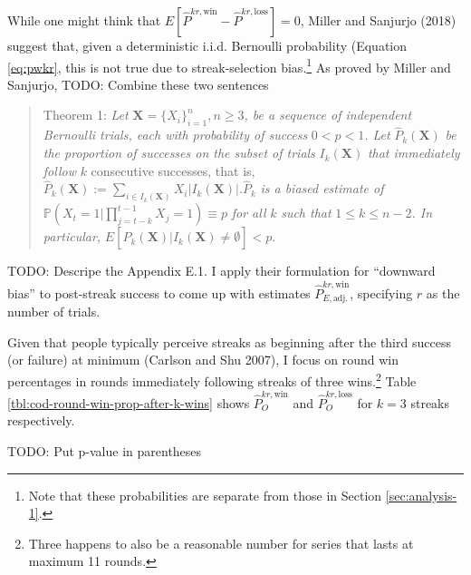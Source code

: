 \documentclass{article}
\begin{document}
While one might think that
\(E[\hat{P}^{kr,\text{win}} - \hat{P}^{kr,\text{loss}}] = 0\), Miller
and Sanjurjo (2018) suggest that, given a deterministic i.i.d. Bernoulli
probability (Equation \ref{eq:pwkr}, this is not true due to
streak-selection bias.\footnote{Note that these probabilities are
  separate from those in Section \ref{sec:analysis-1}.} As proved by
Miller and Sanjurjo, TODO: Combine these two sentences

\begin{quote}
Theorem 1: \emph{Let}
\(\mathbf{X} = \{X_i\}^{n}_{i=1}, n \geq 3\)\emph{, be a sequence of
independent Bernoulli trials, each with probability of success}
\(0 < p < 1\)\emph{. Let} \(\hat{P}_k(\mathbf{X})\) \emph{be the
proportion of successes on the subset of trials} \(I_k(\mathbf{X})\)
\emph{that immediately follow} \(k\) consecutive successes, that is,
\(\hat{P}_k(\mathbf{X}) := \sum_{i \in I_k(\mathbf{X})} X_i | I_k(\mathbf{X}) |. \hat{P}_k\)
\emph{is a biased estimate of}
\(\mathbb{P}(X_t = 1 | \prod_{j=t-k}^{t-1} X_j = 1) \equiv p\) \emph{for
all} \(k\) \emph{such that} \(1 \leq k \leq n - 2\)\emph{. In
particular,}
\(E[\hat{P}_k(\mathbf{X}) | I_k(\mathbf{X}) \neq \emptyset] < p.\)
\end{quote}

TODO: Descripe the Appendix E.1. I apply their formulation for
``downward bias'' to post-streak success to come up with estimates
\(\hat{P}^{kr,\text{win}}_{E,\text{adj.}}\), specifying \(r\) as the
number of trials.

Given that people typically perceive streaks as beginning after the
third success (or failure) at minimum (Carlson and Shu 2007), I focus on
round win percentages in rounds immediately following streaks of three
wins.\footnote{Three happens to also be a reasonable number for series
  that lasts at maximum 11 rounds.} Table
\ref{tbl:cod-round-win-prop-after-k-wins} shows
\(\hat{P}^{kr,\text{win}}_O\) and \(\hat{P}^{kr,\text{loss}}_O\) for
\(k = 3\) streaks respectively.

TODO: Put p-value in parentheses
\end{document}
